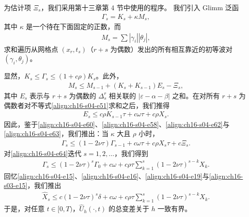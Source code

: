 ﻿\documentclass[../../main.tex]{subfiles}
\begin{document}
为估计项 $\Xi_s$，我们采用第十三章第 4 节中使用的程序。
我们引入 Glimm 泛函
\begin{align}
\Gamma_s=K_s+\kappa M_s,
\label{align:ch16-s04-e60}
\end{align}
其中 $\kappa$ 是一个待在下面固定的正数，而
\begin{align}
M_s=\sum|\gamma_i||\theta_j|,
\label{align:ch16-s04-e61}
\end{align}
求和遍历从网格点 $(x_r,t_s)$（$r+s$ 为偶数）发出的所有相互靠近的初等波对 $(\gamma_i,\theta_j)$。

显然，$K_s\leqslant\Gamma_s\leqslant(1+c\rho)K_s$。此外，
\begin{align}
M_s\leqslant M_{s-1}+(K_s+K_{s-1})E_s-\Xi_s,
\label{align:ch16-s04-e62}
\end{align}
其中 $E_s$ 表示与 $r+s$ 为偶数的 $\Delta_s^r$ 相关联的 $|\varepsilon-\alpha-\beta|$ 之和。在对所有 $r+s$ 为偶数者对不等式\eqref{align:ch16-s04-e51}求和之后，我们推得
\begin{align}
E_s\leqslant c\rho K_{s-1}\tau+c\omega\tau+c\rho X_s.
\label{align:ch16-s04-e63}
\end{align}
因此，鉴于\eqref{align:ch16-s04-e60}、\eqref{align:ch16-s04-e58}、\eqref{align:ch16-s04-e62}与\eqref{align:ch16-s04-e63}，我们推出：当 $\kappa$ 大且 $\rho$ 小时，
\begin{align}
\Gamma_s\leqslant(1-2\nu\tau)\Gamma_{s-1}+c\omega\tau+c\rho X_s\tau+c\Xi_s.
\label{align:ch16-s04-e64}
\end{align}
对\eqref{align:ch16-s04-e64}迭代 $s=1,2,\ldots$，我们得到
\begin{align}
\Gamma_s\leqslant(1-2\nu\tau)^s\Gamma_0+c\omega+c\rho\tau\sum_{k=1}^s(1-2\nu\tau)^{s-k}X_k.
\label{align:ch16-s04-e65}
\end{align}
回忆\eqref{align:ch16-s04-e15}、\eqref{align:ch16-s04-e16}、\eqref{align:ch16-s04-e19}与\eqref{align:ch16-s03-e15}，我们推出
\begin{align}
\hat X_s\leqslant c(1-2\nu\tau)^s\delta+c\omega+c\rho\tau\sum_{k=1}^s(1-2\nu\tau)^{s-k}X_k.
\label{align:ch16-s04-e66}
\end{align}
于是，对任意 $t\in[0,T)$，$\hat U_h(\cdot,t)$ 的总变差关于 $h$ 一致有界。
\end{document}
